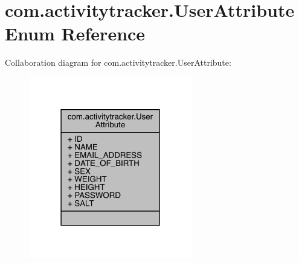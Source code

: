 \hypertarget{enumcom_1_1activitytracker_1_1_user_attribute}{}\section{com.\+activitytracker.\+User\+Attribute Enum Reference}
\label{enumcom_1_1activitytracker_1_1_user_attribute}


Collaboration diagram for com.\+activitytracker.\+User\+Attribute\+:
\nopagebreak
\begin{figure}[H]
\begin{center}
\leavevmode
\includegraphics[width=202pt]{enumcom_1_1activitytracker_1_1_user_attribute__coll__graph}
\end{center}
\end{figure}
